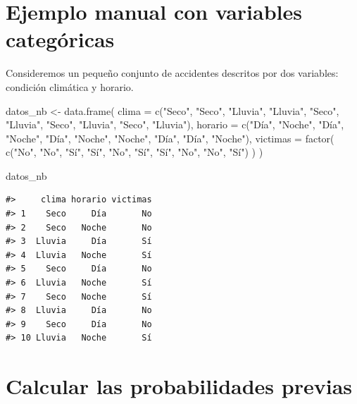 \documentclass[
  spanish,
  10.5pt,
  letterpaper,
  openany,
  headings=big]{scrbook}
\newenvironment{Shaded}{}{}
\newcommand{\AttributeTok}[1]{\textcolor[rgb]{0.84,0.23,0.29}{#1}}
\newcommand{\FunctionTok}[1]{\textcolor[rgb]{0.44,0.26,0.76}{#1}}
\newcommand{\NormalTok}[1]{\textcolor[rgb]{0.14,0.16,0.18}{#1}}
\newcommand{\OtherTok}[1]{\textcolor[rgb]{0.44,0.26,0.76}{#1}}
\newcommand{\StringTok}[1]{\textcolor[rgb]{0.01,0.18,0.38}{#1}}
\begin{document}
\section{Ejemplo manual con variables
categóricas}\label{ejemplo-manual-con-variables-categuxf3ricas}

Consideremos un pequeño conjunto de accidentes descritos por dos
variables: condición climática y horario.

\begin{Shaded}
\begin{Highlighting}[]
\NormalTok{datos\_nb }\OtherTok{\textless{}{-}} \FunctionTok{data.frame}\NormalTok{(}
  \AttributeTok{clima =} \FunctionTok{c}\NormalTok{(}\StringTok{"Seco"}\NormalTok{, }\StringTok{"Seco"}\NormalTok{, }\StringTok{"Lluvia"}\NormalTok{, }\StringTok{"Lluvia"}\NormalTok{, }\StringTok{"Seco"}\NormalTok{,}
            \StringTok{"Lluvia"}\NormalTok{, }\StringTok{"Seco"}\NormalTok{, }\StringTok{"Lluvia"}\NormalTok{, }\StringTok{"Seco"}\NormalTok{, }\StringTok{"Lluvia"}\NormalTok{),}
  \AttributeTok{horario =} \FunctionTok{c}\NormalTok{(}\StringTok{"Día"}\NormalTok{, }\StringTok{"Noche"}\NormalTok{, }\StringTok{"Día"}\NormalTok{, }\StringTok{"Noche"}\NormalTok{, }\StringTok{"Día"}\NormalTok{,}
              \StringTok{"Noche"}\NormalTok{, }\StringTok{"Noche"}\NormalTok{, }\StringTok{"Día"}\NormalTok{, }\StringTok{"Día"}\NormalTok{, }\StringTok{"Noche"}\NormalTok{),}
  \AttributeTok{victimas =} \FunctionTok{factor}\NormalTok{(}
    \FunctionTok{c}\NormalTok{(}\StringTok{"No"}\NormalTok{, }\StringTok{"No"}\NormalTok{, }\StringTok{"Sí"}\NormalTok{, }\StringTok{"Sí"}\NormalTok{, }\StringTok{"No"}\NormalTok{, }\StringTok{"Sí"}\NormalTok{, }\StringTok{"Sí"}\NormalTok{, }\StringTok{"No"}\NormalTok{, }\StringTok{"No"}\NormalTok{, }\StringTok{"Sí"}\NormalTok{)}
\NormalTok{  )}
\NormalTok{)}

\NormalTok{datos\_nb}
\end{Highlighting}
\end{Shaded}

\begin{verbatim}
#>     clima horario victimas
#> 1    Seco     Día       No
#> 2    Seco   Noche       No
#> 3  Lluvia     Día       Sí
#> 4  Lluvia   Noche       Sí
#> 5    Seco     Día       No
#> 6  Lluvia   Noche       Sí
#> 7    Seco   Noche       Sí
#> 8  Lluvia     Día       No
#> 9    Seco     Día       No
#> 10 Lluvia   Noche       Sí
\end{verbatim}

\section{Calcular las probabilidades
previas}\label{calcular-las-probabilidades-previas}
\end{document}
